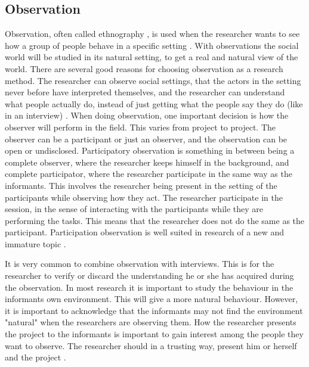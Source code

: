 \subsection{Observation}
Observation, often called ethnography \cite{tjora}, is used when the researcher wants to see how a group of people behave in a specific setting \cite{qualitative}. With observations the social world will be studied in its natural setting, to get a real and natural view of the world. There are several good reasons for choosing observation as a research method. The researcher can observe social settings, that the actors in the setting never before have interpreted themselves, and the researcher can understand what people actually do, instead of just getting what the people say they do (like in an interview) \cite{tjora}. When doing observation, one important decision is how the observer will perform in the field. This varies from project to project. The observer can be a participant or just an observer, and the observation can be open or undisclosed. Participatory observation is something in between being a complete observer, where the researcher keeps himself in the background, and complete participator, where the researcher participate in the same way as the informants. This involves the researcher being present in the setting of the participants while observing how they act. The researcher participate in the session, in the sense of interacting with the participants while they are performing the tasks. This means that the researcher does not do the same as the participant. Participation observation is well suited in research of a new and immature topic \cite{qualitative}.

It is very common to combine observation with interviews. This is for the researcher to verify or discard the understanding he or she has acquired during the observation. In most research it is important to study the behaviour in the informants own environment. This will give a more natural behaviour. However, it is important to acknowledge that the informants may not find the environment "natural" when the researchers are observing them. How the researcher presents the project to the informants is important to gain interest among the people they want to observe. The researcher should in a trusting way, present him or herself and the project \cite{qualitative}.

